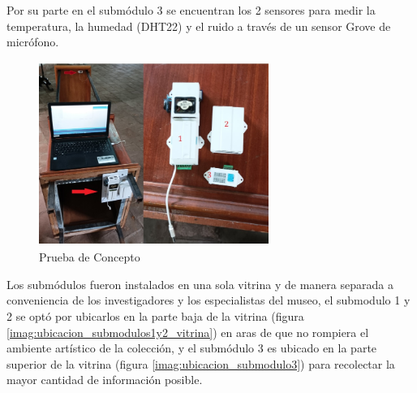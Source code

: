     Por su parte en el submódulo 3 se encuentran los 2 sensores para medir la temperatura, la humedad (DHT22) y el ruido a través de un sensor Grove de micrófono.\\
    
    \begin{figure}[H]
      \centering
      \includegraphics[width=7.5cm, height=6cm]{imagenes/prueba_concepto.jpg}
      \caption{Prueba de Concepto}
      \label{imag:prueba_concepto}
    \end{figure}

    Los submódulos fueron instalados en una sola vitrina y de manera separada a conveniencia de los investigadores y los especialistas del museo, el submodulo 1 y 2 se optó por ubicarlos en la parte baja de la vitrina (figura \ref{imag:ubicacion_submodulos1y2_vitrina}) en aras de que no rompiera el ambiente artístico de la colección,
    y el submódulo 3 es ubicado en la parte superior de la vitrina (figura \ref{imag:ubicacion_submodulo3}) para recolectar la mayor cantidad de información posible.

